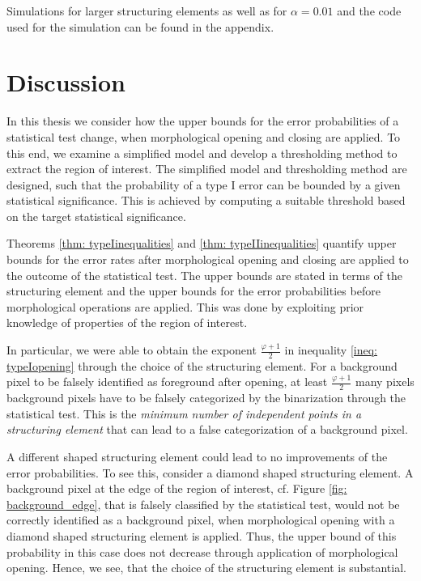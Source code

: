 \documentclass[a4paper,12pt]{article}
\theoremstyle{plain}
\theoremstyle{definition}
\begin{document}
Simulations for larger structuring elements as well as for $\alpha = 0.01$ and the code used for the simulation can be found in the appendix.


%
%
%
%

\newpage



\section{Discussion}\label{section: conclusion}

In this thesis we consider how the upper bounds for the error probabilities of a statistical test change, when morphological opening and closing are applied. To this end, we examine a simplified model and develop a thresholding method to extract the region of interest. The simplified model and thresholding method are designed, such that the probability of a type I error can be bounded by a given statistical significance. This is achieved by computing a suitable threshold based on the target statistical significance.

Theorems \ref{thm: typeIinequalities} and \ref{thm: typeIIinequalities} quantify upper bounds for the error rates after morphological opening and closing are applied to the outcome of the statistical test. The upper bounds are stated in terms of the structuring element and the upper bounds for the error probabilities before morphological operations are applied. This was done by exploiting prior knowledge of properties of the region of interest.

In particular, we were able to obtain the exponent $\frac{\varphi + 1}{2}$ in inequality \eqref{ineq: typeIopening} through the choice of the structuring element. For a background pixel to be falsely identified as foreground after opening, at least $\frac{\varphi + 1}{2}$ many pixels background pixels have to be falsely categorized by the binarization through the statistical test. This is the \emph{minimum number of independent points in a structuring element} that can lead to a false categorization of a background pixel.

A different shaped structuring element could lead to no improvements of the error probabilities. To see this, consider a diamond shaped structuring element. A background pixel at the edge of the region of interest, cf. Figure \ref{fig: background_edge}, that is falsely classified by the statistical test, would not be correctly identified as a background pixel, when morphological opening with a diamond shaped structuring element is applied. Thus, the upper bound of this probability in this case does not decrease through application of morphological opening. Hence, we see, that the choice of the structuring element is substantial.
\end{document}
